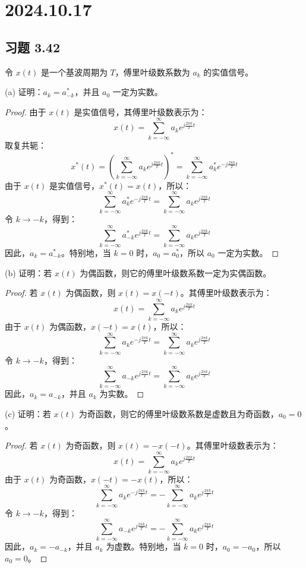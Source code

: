 \documentclass[UTF8]{report}
\theoremstyle{MyLineTheoremStyle} %
\theoremstyle{MyBlockTheoremStyle} %
\theoremstyle{MySubsubsectionStyle} %
\begin{document}
\chapter{2024.10.17}\thispagestyle{fancy}

\section{习题 3.42}

令 $x(t)$ 是一个基波周期为 $T$，傅里叶级数系数为 $a_k$ 的实值信号。

(a) 证明：$a_k = a_{-k}^*$，并且 $a_0$ 一定为实数。

\begin{proof}
由于 $x(t)$ 是实值信号，其傅里叶级数表示为：
\[
x(t) = \sum_{k=-\infty}^{\infty} a_k e^{j\frac{2\pi k}{T}t}
\]
取复共轭：
\[
x^*(t) = \left( \sum_{k=-\infty}^{\infty} a_k e^{j\frac{2\pi k}{T}t} \right)^* = \sum_{k=-\infty}^{\infty} a_k^* e^{-j\frac{2\pi k}{T}t}
\]
由于 $x(t)$ 是实值信号，$x^*(t) = x(t)$，所以：
\[
\sum_{k=-\infty}^{\infty} a_k^* e^{-j\frac{2\pi k}{T}t} = \sum_{k=-\infty}^{\infty} a_k e^{j\frac{2\pi k}{T}t}
\]
令 $k \rightarrow -k$，得到：
\[
\sum_{k=-\infty}^{\infty} a_{-k}^* e^{j\frac{2\pi k}{T}t} = \sum_{k=-\infty}^{\infty} a_k e^{j\frac{2\pi k}{T}t}
\]
因此，$a_k = a_{-k}^*$。特别地，当 $k=0$ 时，$a_0 = a_0^*$，所以 $a_0$ 一定为实数。
\end{proof}

(b) 证明：若 $x(t)$ 为偶函数，则它的傅里叶级数系数一定为实偶函数。

\begin{proof}
若 $x(t)$ 为偶函数，则 $x(t) = x(-t)$。其傅里叶级数表示为：
\[
x(t) = \sum_{k=-\infty}^{\infty} a_k e^{j\frac{2\pi k}{T}t}
\]
由于 $x(t)$ 为偶函数，$x(-t) = x(t)$，所以：
\[
\sum_{k=-\infty}^{\infty} a_k e^{-j\frac{2\pi k}{T}t} = \sum_{k=-\infty}^{\infty} a_k e^{j\frac{2\pi k}{T}t}
\]
令 $k \rightarrow -k$，得到：
\[
\sum_{k=-\infty}^{\infty} a_{-k} e^{j\frac{2\pi k}{T}t} = \sum_{k=-\infty}^{\infty} a_k e^{j\frac{2\pi k}{T}t}
\]
因此，$a_k = a_{-k}$，并且 $a_k$ 为实数。
\end{proof}

(c) 证明：若 $x(t)$ 为奇函数，则它的傅里叶级数系数是虚数且为奇函数，$a_0 = 0$。

\begin{proof}
若 $x(t)$ 为奇函数，则 $x(t) = -x(-t)$。其傅里叶级数表示为：
\[
x(t) = \sum_{k=-\infty}^{\infty} a_k e^{j\frac{2\pi k}{T}t}
\]
由于 $x(t)$ 为奇函数，$x(-t) = -x(t)$，所以：
\[
\sum_{k=-\infty}^{\infty} a_k e^{-j\frac{2\pi k}{T}t} = -\sum_{k=-\infty}^{\infty} a_k e^{j\frac{2\pi k}{T}t}
\]
令 $k \rightarrow -k$，得到：
\[
\sum_{k=-\infty}^{\infty} a_{-k} e^{j\frac{2\pi k}{T}t} = -\sum_{k=-\infty}^{\infty} a_k e^{j\frac{2\pi k}{T}t}
\]
因此，$a_k = -a_{-k}$，并且 $a_k$ 为虚数。特别地，当 $k=0$ 时，$a_0 = -a_0$，所以 $a_0 = 0$。
\end{proof}
\end{document}
